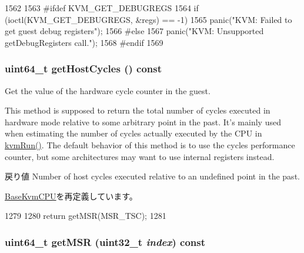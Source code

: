\begin{DoxyCode}
1562 {
1563 #ifdef KVM_GET_DEBUGREGS
1564     if (ioctl(KVM_GET_DEBUGREGS, &regs) == -1)
1565         panic("KVM: Failed to get guest debug registers\n");
1566 #else
1567     panic("KVM: Unsupported getDebugRegisters call.\n");
1568 #endif
1569 }
\end{DoxyCode}
\hypertarget{classX86KvmCPU_abcad2a22057ba48360b17b978f694b48}{
\subsubsection[{getHostCycles}]{\setlength{\rightskip}{0pt plus 5cm}uint64\_\-t getHostCycles () const}}
\label{classX86KvmCPU_abcad2a22057ba48360b17b978f694b48}
Get the value of the hardware cycle counter in the guest.

This method is supposed to return the total number of cycles executed in hardware mode relative to some arbitrary point in the past. It's mainly used when estimating the number of cycles actually executed by the CPU in \hyperlink{classX86KvmCPU_aed3dbd0c0bf26d82ee56367a3f350506}{kvmRun()}. The default behavior of this method is to use the cycles performance counter, but some architectures may want to use internal registers instead.

\begin{DoxyReturn}{戻り値}
Number of host cycles executed relative to an undefined point in the past. 
\end{DoxyReturn}


\hyperlink{classBaseKvmCPU_abcad2a22057ba48360b17b978f694b48}{BaseKvmCPU}を再定義しています。


\begin{DoxyCode}
1279 {
1280     return getMSR(MSR_TSC);
1281 }
\end{DoxyCode}
\hypertarget{classX86KvmCPU_ad242a06d6443c10c74eac568fb44fcfe}{
\subsubsection[{getMSR}]{\setlength{\rightskip}{0pt plus 5cm}uint64\_\-t getMSR ({\bf uint32\_\-t} {\em index}) const}}
\label{classX86KvmCPU_ad242a06d6443c10c74eac568fb44fcfe}



